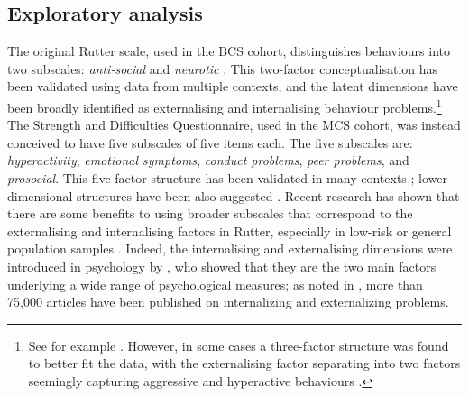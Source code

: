 \subsection{Exploratory analysis \label{sec:ea}}

The original Rutter scale, used in the BCS cohort, distinguishes behaviours into two subscales: \emph{anti-social} and \emph{neurotic} \citep{Rutter1970}. This two-factor conceptualisation has been validated using data from multiple contexts, and the latent dimensions have been broadly identified as externalising and internalising behaviour problems.\footnote{See for example \citet{Fowler1979,Venables1983,Tremblay1987,Berglund1999,Klein2009}. However, in some cases a three-factor structure was found to better fit the data, with the externalising factor separating into two factors seemingly capturing aggressive and hyperactive behaviours \citep{Behar1974,McGee1985}.} The Strength and Difficulties Questionnaire, used in the MCS cohort, was instead conceived to have five subscales of five items each. The five subscales are: \emph{hyperactivity}, \emph{emotional symptoms}, \emph{conduct problems}, \emph{peer problems}, and \emph{prosocial}. This five-factor structure has been validated in many contexts \citep{Stone2010}; lower-dimensional structures have been also suggested \citep{Dickey2004}. Recent research has shown that there are some benefits to using broader subscales that correspond to the externalising and internalising factors in Rutter, especially in low-risk or general population samples \citep{Goodman2010}. Indeed, the internalising and externalising dimensions were introduced in psychology by \citet{Achenbach1966}, who showed that they are the two main factors underlying a wide range of psychological measures; as noted in \citet{Achenbach2016}, more than 75,000 articles have been published on internalizing and externalizing problems.

